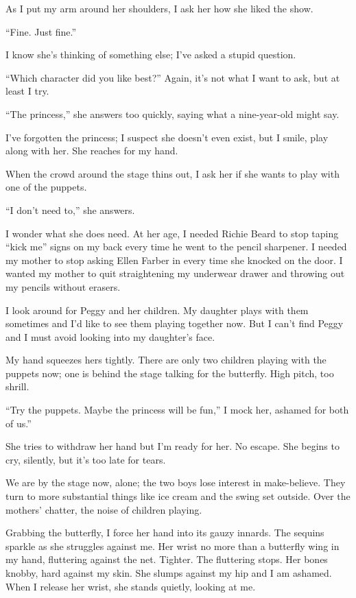 \documentclass[twoside,10pt]{book}
\begin{document}
As I put my arm around her shoulders, I ask her how she liked the show.

``Fine. Just fine.''

I know she's thinking of something else; I've asked a stupid question.

``Which character did you like best?'' Again, it's not what I want to
ask, but at least I try.

``The princess,'' she answers too quickly, saying what a nine-year-old
might say.

I've forgotten the princess; I suspect she doesn't even exist, but I
smile, play along with her. She reaches for my hand.

When the crowd around the stage thins out, I ask her if she wants to
play with one of the puppets.

``I don't need to,'' she answers.

I wonder what she does need. At her age, I needed Richie Beard to stop
taping ``kick me'' signs on my back every time he went to the pencil
sharpener. I needed my mother to stop asking Ellen Farber in every time
she knocked on the door. I wanted my mother to quit straightening my
under­wear drawer and throwing out my pencils without erasers.

I look around for Peggy and her children. My daughter plays with them
sometimes and I'd like to see them playing together now. But I can't
find Peggy and I must avoid looking into my daughter's face.

My hand squeezes hers tightly. There are only two children playing with
the puppets now; one is behind the stage talking for the butterfly. High
pitch, too shrill.

``Try the puppets. Maybe the princess will be fun,'' I mock her, ashamed
for both of us.''

She tries to withdraw her hand but I'm ready for her. No escape. She
begins to cry, silently, but it's too late for tears.

We are by the stage now, alone; the two boys lose interest in
make-believe. They turn to more substantial things like ice cream and
the swing set outside. Over the mothers' chatter, the noise of chil­dren
playing.

Grabbing the butterfly, I force her hand into its gauzy innards. The
sequins sparkle as she struggles against me. Her wrist no more than a
butterfly wing in my hand, fluttering against the net. Tighter. The
fluttering stops. Her bones knobby, hard against my skin. She slumps
against my hip and I am ashamed. When I release her wrist, she stands
quietly, looking at me.
\end{document}
